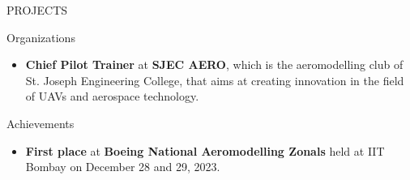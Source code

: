 \documentclass{resume} %
\begin{document}
\begin{rSection}{PROJECTS}
\end{rSection}


\begin{rSection}{Organizations}
    \begin{itemize}

        \item 	\textbf{Chief Pilot Trainer} at \textbf{SJEC AERO}, which is the aeromodelling club of St. Joseph Engineering College, that aims at creating innovation in the field of UAVs and aerospace technology.




    \end{itemize}


\end{rSection}


\begin{rSection}{Achievements}
    \begin{itemize}

        \item 	\textbf{First place} at \textbf{Boeing National Aeromodelling Zonals} held at IIT Bombay on December 28 and 29, 2023.



    \end{itemize}


\end{rSection}
\end{document}
